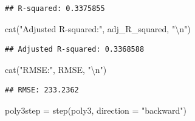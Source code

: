 \documentclass[
]{article}
\newenvironment{Shaded}{\begin{snugshade}}{\end{snugshade}}
\newcommand{\AttributeTok}[1]{\textcolor[rgb]{0.77,0.63,0.00}{#1}}
\newcommand{\FunctionTok}[1]{\textcolor[rgb]{0.00,0.00,0.00}{#1}}
\newcommand{\NormalTok}[1]{#1}
\newcommand{\OtherTok}[1]{\textcolor[rgb]{0.56,0.35,0.01}{#1}}
\newcommand{\SpecialCharTok}[1]{\textcolor[rgb]{0.00,0.00,0.00}{#1}}
\newcommand{\StringTok}[1]{\textcolor[rgb]{0.31,0.60,0.02}{#1}}
\begin{document}
\begin{verbatim}
## R-squared: 0.3375855
\end{verbatim}

\begin{Shaded}
\begin{Highlighting}[]
\FunctionTok{cat}\NormalTok{(}\StringTok{"Adjusted R{-}squared:"}\NormalTok{, adj\_R\_squared, }\StringTok{"}\SpecialCharTok{\textbackslash{}n}\StringTok{"}\NormalTok{)}
\end{Highlighting}
\end{Shaded}

\begin{verbatim}
## Adjusted R-squared: 0.3368588
\end{verbatim}

\begin{Shaded}
\begin{Highlighting}[]
\FunctionTok{cat}\NormalTok{(}\StringTok{"RMSE:"}\NormalTok{, RMSE, }\StringTok{"}\SpecialCharTok{\textbackslash{}n}\StringTok{"}\NormalTok{)}
\end{Highlighting}
\end{Shaded}

\begin{verbatim}
## RMSE: 233.2362
\end{verbatim}

\begin{Shaded}
\begin{Highlighting}[]
\NormalTok{poly3step }\OtherTok{=} \FunctionTok{step}\NormalTok{(poly3, }\AttributeTok{direction =} \StringTok{"backward"}\NormalTok{)}
\end{Highlighting}
\end{Shaded}
\end{document}
